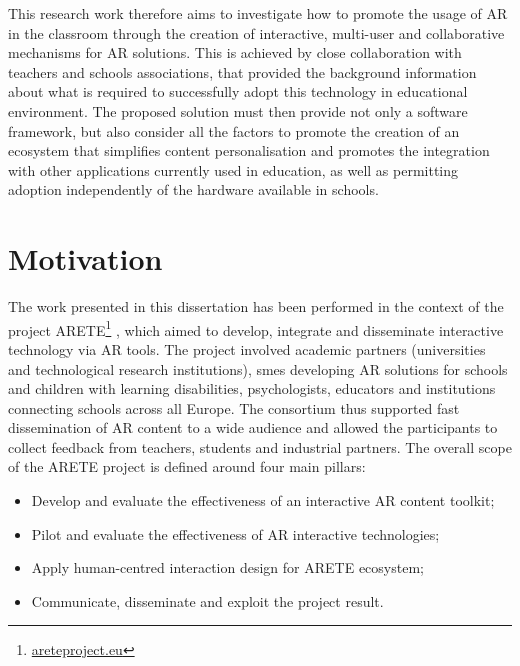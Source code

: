 This research work therefore aims to investigate how to promote the usage of AR in the classroom through the creation of interactive, multi-user and collaborative mechanisms for AR solutions. This is achieved by close collaboration with teachers and schools associations, that provided the background information about what is required to successfully adopt this technology in educational environment. The proposed solution must then provide not only a software framework, but also consider all the factors to promote the creation of an ecosystem that simplifies content personalisation and promotes the integration with other applications currently used in education, as well as permitting adoption independently of the hardware available in schools.

\section{Motivation}\label{sec:motivation}
The work presented in this dissertation has been performed in the context of the project ARETE\footnote{\url{areteproject.eu}} \citep{masneri2020work}, which aimed to develop, integrate and disseminate interactive technology via AR tools. The project involved academic partners (universities and technological research institutions), \glspl{sme} developing AR solutions for schools and children with learning disabilities, psychologists, educators and institutions connecting schools across all Europe. The consortium thus supported fast dissemination of AR content to a wide audience and allowed the participants to collect feedback from teachers, students and industrial partners. The overall scope of the ARETE project is defined around four main pillars:

\begin{itemize}
    \item Develop and evaluate the effectiveness of an interactive AR content toolkit;
    \item Pilot and evaluate the effectiveness of AR interactive technologies;
    \item Apply human-centred interaction design for ARETE ecosystem;
    \item Communicate, disseminate and exploit the project result.
\end{itemize}


